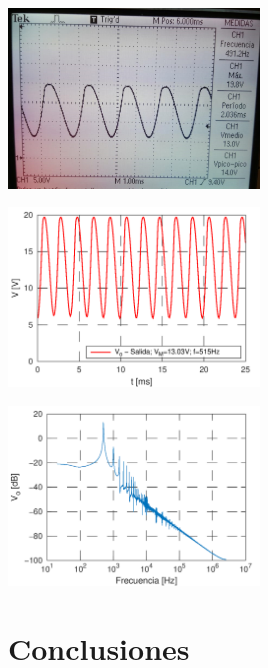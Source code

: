 \documentclass[a4paper, 10pt, spanish]{article}
\begin{document}
        \begin{center}
          \includegraphics[width=0.5\textwidth]{med_oscilador_cc.png}
          \label{fig:med_out_oscilador}
        \end{center}

        \begin{center}
          \includegraphics[width=0.5\textwidth]{salida_oscilador.png}
          \label{fig:sim_out_oscilador}
        \end{center}


        \begin{center}
          \includegraphics[width=0.5\textwidth]{fft_oscilador.png}
          \label{fig:fft}
        \end{center}


        \clearpage
                \section{Conclusiones}
\end{document}
